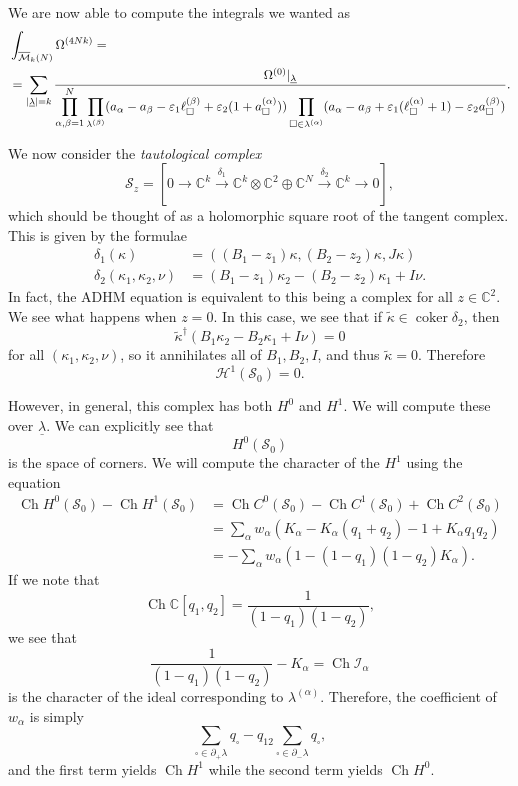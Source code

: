 \documentclass[leqno, openany]{memoir}
\theoremstyle{definition}
\theoremstyle{remark}
\theoremstyle{plain}
\theoremstyle{definition}
\theoremstyle{remark}
\newcommand{\C}{\mathbb{C}}
\newcommand{\ep}{\varepsilon}
\newcommand{\mc}[1]{\mathcal{#1}}
\newcommand{\on}[1]{\operatorname{#1}}
\newcommand{\ol}[1]{\overline{#1}}
\newcommand{\ul}[1]{\underline{#1}}
\newcommand{\wt}[1]{\widetilde{#1}}
\begin{document}
We are now able to compute the integrals we wanted as
\begin{align*}
    &\int_{\ol{\mc{M}}_k(N)} \Omega^{(4Nk)} =\\
    &=\sum_{\abs{\ul{\lambda}} = k} \frac{\Omega^{(0)}|_{\ul{\lambda}}}{\displaystyle\prod_{\alpha,\beta=1}^N \prod_{\box \in \lambda^{(\beta)}}(a_{\alpha}-a_{\beta} - \ep_1 \ell_{\square}^{(\beta)}+ \ep_2 (1+a_{\square}^{(\alpha)})) \prod_{\square \in \lambda^{(\alpha)}} (a_{\alpha}-a_{\beta}+\ep_1 (\ell_{\square}^{(\alpha)}+1) - \ep_2 a_{\square}^{(\beta)})}.
\end{align*}

We now consider the \textit{tautological complex}
\[ \mc{S}_z = [0 \to \C^k \xrightarrow{\delta_1} \C^k \otimes \C^2 \oplus \C^N \xrightarrow{\delta_2} \C^k \to 0], \]
which should be thought of as a holomorphic square root of the tangent complex. This is given by the formulae
\begin{align*}
    \delta_1(\kappa) &= ((B_1-z_1) \kappa, (B_2 - z_2) \kappa, J \kappa) \\
    \delta_2(\kappa_1, \kappa_2, \nu) &= (B_1 - z_1) \kappa_2 - (B_2 - z_2) \kappa_1 + I \nu. 
\end{align*}
In fact, the ADHM equation is equivalent to this being a complex for all $z \in \C^2$. We see what happens when $z=0$. In this case, we see that if $\wt{\kappa} \in \on{coker} \delta_2$, then
\[ \wt{\kappa}^{\dag}(B_1 \kappa_2- B_2 \kappa_1 + I \nu) = 0 \]
for all $(\kappa_1, \kappa_2, \nu)$, so it annihilates all of $B_1, B_2, I$, and thus $\wt{\kappa} = 0$. Therefore
\[ \mc{H}^1(\mc{S}_0) = 0. \]

However, in general, this complex has both $H^0$ and $H^1$. We will compute these over $\ul{\lambda}$. We can explicitly see that
\[ H^0(\mc{S}_0) \]
is the space of corners. We will compute the character of the $H^1$ using the equation
\begin{align*}
    \on{Ch} H^0(\mc{S}_0) - \on{Ch} H^1(\mc{S}_0) &= \on{Ch} C^0(\mc{S}_0) - \on{Ch} C^1(\mc{S}_0) + \on{Ch} C^2(\mc{S}_0) \\
    &= \sum_{\alpha} w_{\alpha}(K_{\alpha} - K_{\alpha}(q_1 + q_2) - 1 + K_{\alpha} q_1q_2) \\
    &= -\sum_{\alpha} w_{\alpha}(1-(1-q_1)(1-q_2) K_{\alpha}).
\end{align*}
If we note that
\[ \on{Ch} \C[q_1, q_2] = \frac{1}{(1-q_1)(1-q_2)}, \]
we see that
\[ \frac{1}{(1-q_1)(1-q_2)} - K_{\alpha} = \on{Ch} \mc{I}_{\alpha} \]
is the character of the ideal corresponding to $\lambda^{(\alpha)}$.
Therefore, the coefficient of $w_{\alpha}$ is simply
\[ \sum_{\square \in \partial_+\lambda} q_{\square} - q_{12} \sum_{\square \in \partial_- \lambda} q_{\square}, \]
and the first term yields $\on{Ch} H^1$ while the second term yields $\on{Ch} H^0$.
\end{document}
